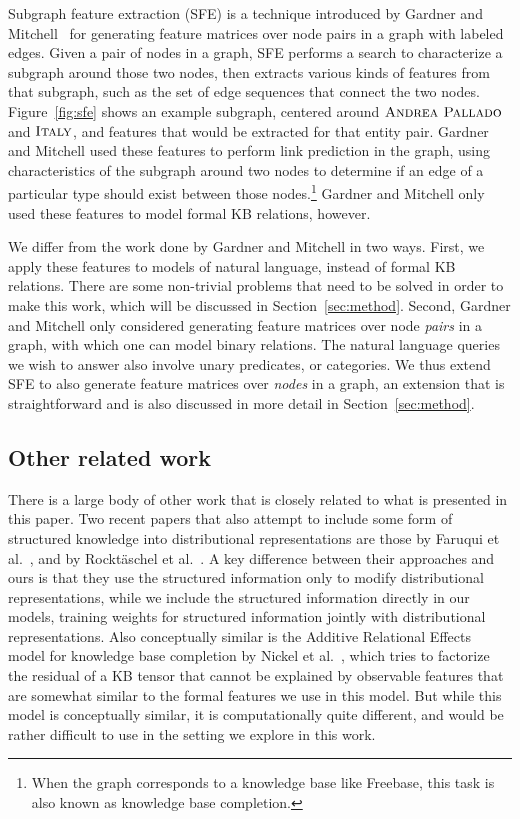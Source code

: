 \documentclass[11pt]{article}
\newcommand{\secref}[1]{Section~\ref{sec:#1}}
\newcommand{\figref}[1]{Figure~\ref{fig:#1}}
\newcommand{\entity}[1]{\ensuremath{\textsc{#1}}}
\begin{document}
Subgraph feature extraction (SFE) is a technique introduced by Gardner and
Mitchell~ for generating feature matrices over node
pairs in a graph with labeled edges.  Given a pair of nodes in a graph, SFE
performs a search to characterize a subgraph around those two nodes, then
extracts various kinds of features from that subgraph, such as the set of edge
sequences that connect the two nodes.  \figref{sfe} shows an example subgraph,
centered around \entity{Andrea Pallado} and \entity{Italy}, and features that
would be extracted for that entity pair.  Gardner and Mitchell used these
features to perform link prediction in the graph, using characteristics of the
subgraph around two nodes to determine if an edge of a particular type should
exist between those nodes.\footnote{When the graph corresponds to a knowledge
base like Freebase, this task is also known as knowledge base completion.}
Gardner and Mitchell only used these features to model formal KB relations,
however.

We differ from the work done by Gardner and Mitchell in two ways.  First, we
apply these features to models of natural language, instead of formal KB
relations.  There are some non-trivial problems that need to be solved in order
to make this work, which will be discussed in \secref{method}.  Second, Gardner
and Mitchell only considered generating feature matrices over node \emph{pairs}
in a graph, with which one can model binary relations.  The natural language
queries we wish to answer also involve unary predicates, or categories.  We
thus extend SFE to also generate feature matrices over \emph{nodes} in a graph,
an extension that is straightforward and is also discussed in more detail in
\secref{method}.

\subsection{Other related work}

There is a large body of other work that is closely related to what is
presented in this paper.  Two recent papers that also attempt to include some
form of structured knowledge into distributional representations are those by
Faruqui et al.~, and by
Rockt\"{a}schel et al.~.  A key
difference between their approaches and ours is that they use the structured
information only to modify distributional representations, while we include the
structured information directly in our models, training weights for structured
information jointly with distributional representations.  Also conceptually
similar is the Additive Relational Effects model for knowledge base completion
by Nickel et al.~, which tries to factorize the
residual of a KB tensor that cannot be explained by observable features that
are somewhat similar to the formal features we use in this model.  But while
this model is conceptually similar, it is computationally quite different, and
would be rather difficult to use in the setting we explore in this work.
\end{document}
